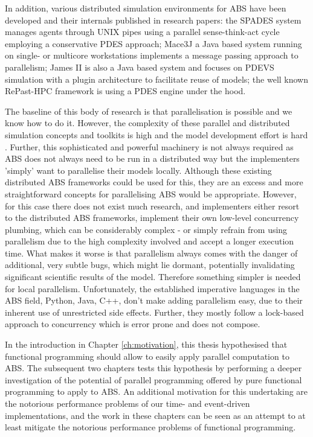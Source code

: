 In addition, various distributed simulation environments for ABS have been developed and their internals published in research papers: the SPADES system \cite{riley_next_2003} manages agents through UNIX pipes using a parallel sense-think-act cycle employing a conservative PDES approach; Mace3J \cite{gasser_mace3j:_2002} a Java based system running on single- or multicore workstations implements a message passing approach to parallelism; James II \cite{himmelspach_plugn_2007} is also a Java based system and focuses on PDEVS simulation with a plugin architecture to facilitate reuse of models; the well known RePast-HPC \cite{gorur_repast_2016, minson_distributing_2008} framework is using a PDES engine under the hood. 

The baseline of this body of research is that parallelisation is possible and we know how to do it. However, the complexity of these parallel and distributed simulation concepts and toolkits is high and the model development effort is hard \cite{abar_agent_2017}. Further, this sophisticated and powerful machinery is not always required as ABS does not always need to be run in a distributed way but the implementers 'simply' want to parallelise their models locally. Although these existing distributed ABS frameworks could be used for this, they are an excess and more straightforward concepts for parallelising ABS would be appropriate. However, for this case there does not exist much research, and implementers either resort to the distributed ABS frameworks, implement their own low-level concurrency plumbing, which can be considerably complex - or simply refrain from using parallelism due to the high complexity involved and accept a longer execution time. What makes it worse is that parallelism always comes with the danger of additional, very subtle bugs, which might lie dormant, potentially invalidating significant scientific results of the model. Therefore something simpler is needed for local parallelism. Unfortunately, the established imperative languages in the ABS field, Python, Java, C++, don't make adding parallelism easy, due to their inherent use of unrestricted side effects. Further, they mostly follow a lock-based approach to concurrency which is error prone and does not compose.

\medskip

In the introduction in Chapter \ref{ch:motivation}, this thesis hypothesised that functional programming should allow to easily apply parallel computation to ABS. The subsequent two chapters tests this hypothesis by performing a deeper investigation of the potential of parallel programming offered by pure functional programming to apply to ABS. An additional motivation for this undertaking are the notorious performance problems of our time- and event-driven implementations, and the work in these chapters can be seen as an attempt to at least mitigate the notorious performance problems of functional programming.

